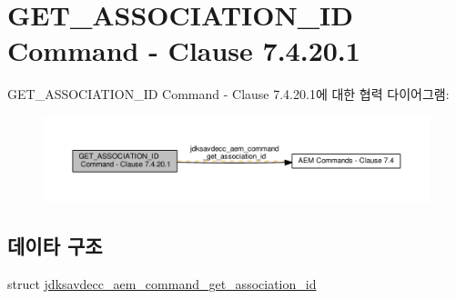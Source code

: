 \hypertarget{group__command__get__association__id}{}\section{G\+E\+T\+\_\+\+A\+S\+S\+O\+C\+I\+A\+T\+I\+O\+N\+\_\+\+ID Command -\/ Clause 7.4.20.1}
\label{group__command__get__association__id}
G\+E\+T\+\_\+\+A\+S\+S\+O\+C\+I\+A\+T\+I\+O\+N\+\_\+\+ID Command -\/ Clause 7.4.20.1에 대한 협력 다이어그램\+:
\nopagebreak
\begin{figure}[H]
\begin{center}
\leavevmode
\includegraphics[width=350pt]{group__command__get__association__id}
\end{center}
\end{figure}
\subsection*{데이타 구조}
\begin{DoxyCompactItemize}
\item 
struct \hyperlink{structjdksavdecc__aem__command__get__association__id}{jdksavdecc\+\_\+aem\+\_\+command\+\_\+get\+\_\+association\+\_\+id}
\end{DoxyCompactItemize}
